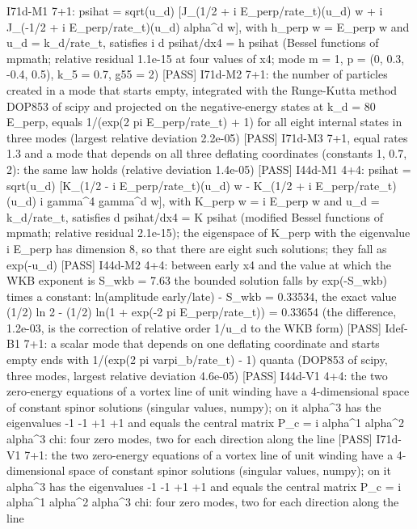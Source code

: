 \documentclass[
  10pt,
]{article}
\newenvironment{Shaded}{}{}
\newcommand{\NormalTok}[1]{#1}
\begin{document}
\begin{Shaded}
\begin{Highlighting}[]
\NormalTok{[PASS] I71d{-}M1  7+1: psihat = sqrt(u\_d) [J\_(1/2 + i E\_perp/rate\_t)(u\_d) w + i J\_({-}1/2 + i E\_perp/rate\_t)(u\_d) alpha\^{}d w], with h\_perp w = E\_perp w and u\_d = k\_d/rate\_t, satisfies i d psihat/dx4 = h psihat (Bessel functions of mpmath; relative residual 1.1e{-}15 at four values of x4; mode m = 1, p = (0, 0.3, {-}0.4, 0.5), k\_5 = 0.7, g55 = 2)}
\NormalTok{[PASS] I71d{-}M2  7+1: the number of particles created in a mode that starts empty, integrated with the Runge{-}Kutta method DOP853 of scipy and projected on the negative{-}energy states at k\_d = 80 E\_perp, equals 1/(exp(2 pi E\_perp/rate\_t) + 1) for all eight internal states in three modes (largest relative deviation 2.2e{-}05)}
\NormalTok{[PASS] I71d{-}M3  7+1, equal rates 1.3 and a mode that depends on all three deflating coordinates (constants 1, 0.7, 2): the same law holds (relative deviation 1.4e{-}05)}
\NormalTok{[PASS] I44d{-}M1  4+4: psihat = sqrt(u\_d) [K\_(1/2 {-} i E\_perp/rate\_t)(u\_d) w {-} K\_(1/2 + i E\_perp/rate\_t)(u\_d) i gamma\^{}4 gamma\^{}d w], with K\_perp w = i E\_perp w and u\_d = k\_d/rate\_t, satisfies d psihat/dx4 = K psihat (modified Bessel functions of mpmath; relative residual 2.1e{-}15); the eigenspace of K\_perp with the eigenvalue i E\_perp has dimension 8, so that there are eight such solutions; they fall as exp({-}u\_d)}
\NormalTok{[PASS] I44d{-}M2  4+4: between early x4 and the value at which the WKB exponent is S\_wkb = 7.63 the bounded solution falls by exp({-}S\_wkb) times a constant: ln(amplitude early/late) {-} S\_wkb = 0.33534, the exact value (1/2) ln 2 {-} (1/2) ln(1 + exp({-}2 pi E\_perp/rate\_t)) = 0.33654 (the difference, 1.2e{-}03, is the correction of relative order 1/u\_d to the WKB form)}
\NormalTok{[PASS] Idef{-}B1  7+1: a scalar mode that depends on one deflating coordinate and starts empty ends with 1/(exp(2 pi varpi\_b/rate\_t) {-} 1) quanta (DOP853 of scipy, three modes, largest relative deviation 4.6e{-}05)}
\NormalTok{[PASS] I44d{-}V1  4+4: the two zero{-}energy equations of a vortex line of unit winding have a 4{-}dimensional space of constant spinor solutions (singular values, numpy); on it alpha\^{}3 has the eigenvalues {-}1 {-}1 +1 +1 and equals the central matrix P\_c = i alpha\^{}1 alpha\^{}2 alpha\^{}3 chi: four zero modes, two for each direction along the line}
\NormalTok{[PASS] I71d{-}V1  7+1: the two zero{-}energy equations of a vortex line of unit winding have a 4{-}dimensional space of constant spinor solutions (singular values, numpy); on it alpha\^{}3 has the eigenvalues {-}1 {-}1 +1 +1 and equals the central matrix P\_c = i alpha\^{}1 alpha\^{}2 alpha\^{}3 chi: four zero modes, two for each direction along the line}

\end{Highlighting}
\end{Shaded}
\end{document}

